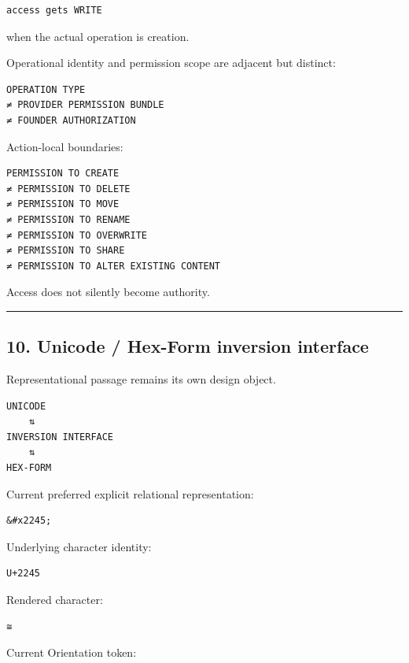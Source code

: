 \begin{verbatim}
access gets WRITE
\end{verbatim}

when the actual operation is creation.

Operational identity and permission scope are adjacent but distinct:

\begin{verbatim}
OPERATION TYPE
≠ PROVIDER PERMISSION BUNDLE
≠ FOUNDER AUTHORIZATION
\end{verbatim}

Action-local boundaries:

\begin{verbatim}
PERMISSION TO CREATE
≠ PERMISSION TO DELETE
≠ PERMISSION TO MOVE
≠ PERMISSION TO RENAME
≠ PERMISSION TO OVERWRITE
≠ PERMISSION TO SHARE
≠ PERMISSION TO ALTER EXISTING CONTENT
\end{verbatim}

Access does not silently become authority.

\begin{center}\rule{0.5\linewidth}{0.5pt}\end{center}

\subsection{10. Unicode / Hex-Form inversion
interface}\label{unicode-hex-form-inversion-interface}

Representational passage remains its own design object.

\begin{verbatim}
UNICODE
    ⇅
INVERSION INTERFACE
    ⇅
HEX-FORM
\end{verbatim}

Current preferred explicit relational representation:

\begin{verbatim}
&#x2245;
\end{verbatim}

Underlying character identity:

\begin{verbatim}
U+2245
\end{verbatim}

Rendered character:

\begin{verbatim}
≅
\end{verbatim}

Current Orientation token:

